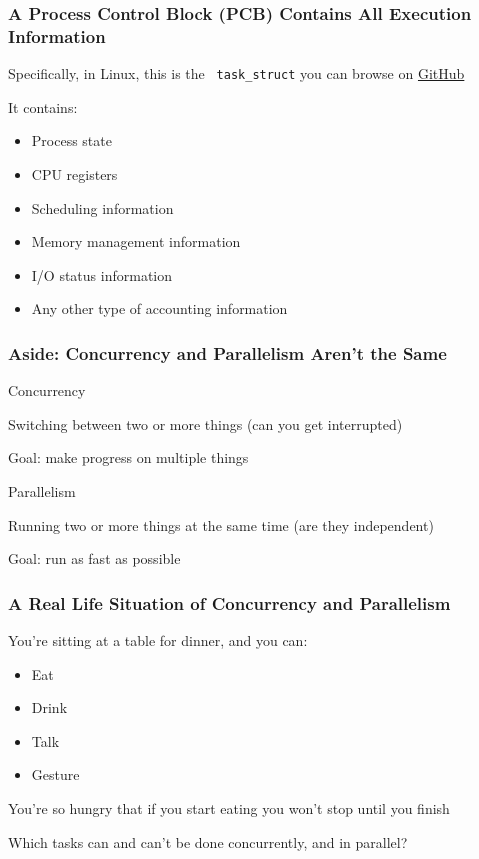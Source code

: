  \begin{frame}
    \frametitle{A Process Control Block (PCB) Contains All Execution Information}


    Specifically, in Linux, this is the \texttt{\color{primarycolor}
    task\_struct} you can browse on
    \href{https://github.com/torvalds/linux/blob/master/include/linux/sched.h\#L727}
         {GitHub}

    \vspace{2em}

    It contains:
    \begin{itemize}
      \item Process state
      \item CPU registers
      \item Scheduling information
      \item Memory management information
      \item I/O status information
      \item Any other type of accounting information
    \end{itemize}
  \end{frame}

  \begin{frame}
    \frametitle{Aside: Concurrency and Parallelism Aren't the Same}

    Concurrency

    \hspace{2em} Switching between two or more things (can you get interrupted)

    \hspace{4em} Goal: make progress on multiple things

    \vspace{4em}

    Parallelism

    \hspace{2em} Running two or more things at the same time (are they independent)

    \hspace{4em} Goal: run as fast as possible
  \end{frame}

  \begin{frame}
    \frametitle{A Real Life Situation of Concurrency and Parallelism}


    You're sitting at a table for dinner, and you can:
    \begin{itemize}
      \item Eat
      \item Drink
      \item Talk
      \item Gesture
    \end{itemize}
    You're so hungry that if you start eating you won't stop until you finish

    \vspace{4em}

    Which tasks can and can't be done concurrently, and in parallel?
  \end{frame}

